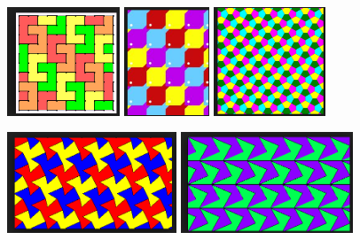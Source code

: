 \begin{center}
\includegraphics[height=3.25cm]{tessellate2}
\qquad
\includegraphics[height=3.25cm]{tessellate5}
\qquad
\includegraphics[height=3.25cm]{tessellate6}

\bigskip

\includegraphics[height=3cm]{tessellate3}
\qquad\qquad
\includegraphics[height=3cm]{tessellate7}

\end{center}

\newpage 

